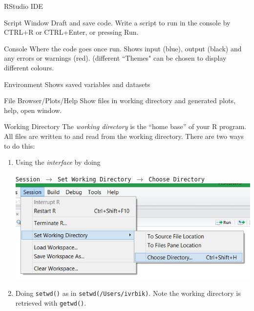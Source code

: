 \documentclass[xcolor=svgnames, 10pt]{beamer}
\begin{document}
\begin{frame}[fragile]{RStudio IDE}
\begin{block}{Script Window}
Draft and save code.  Write a script to run in the console by CTRL+R or CTRL+Enter, or pressing Run.
\end{block}

\begin{block}{Console}
Where the code goes once run.  Shows {\color{blue} input (blue)}, output (black) and any {\color{red}errors or warnings (red)}. (different ``Themes" can be chosen to display different colours.
\end{block}

\begin{block}{Environment}
Shows saved variables and datasets
\end{block}

\begin{block}{File Browser/Plots/Help}
Show files in working directory and generated plots, help, open window.
\end{block}
\end{frame}


\begin{frame}[fragile]{Working Directory}
The \emph{working directory} is the ``home base'' of your R program.  All files are written to and read from the working directory.  There are two ways to do this:
\begin{enumerate}
\item Using the \emph{interface} by doing 
\begin{center}
\texttt{Session $\to$ Set Working Directory $\to$ Choose Directory}\\[1em]
\includegraphics[width=.5\textwidth]{images/session}
\end{center}
\item Doing \texttt{setwd()} as in \texttt{\textquotedbl setwd(/Users/ivrbik)\textquotedbl}.  Note the working directory is retrieved with \texttt{getwd()}.
\end{enumerate}
\end{frame}
\end{document}
